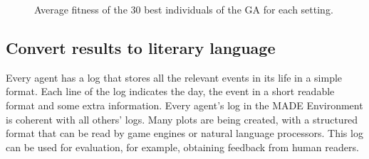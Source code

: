 \documentclass[letterpaper]{article}
\begin{document}
\begin{figure}[htb]
{   \label{fig:subfig2}
}
\caption{Average fitness of the 30 best individuals of the GA for each setting.}
\label{fig:graph}
\end{figure}







\subsection{Convert results to literary language}

Every agent has a log that stores all the relevant events in its life
in a simple format. Each line of the log indicates the day, the event
in a short readable format and some extra information. Every agent's
log in the MADE Environment is coherent with all others' logs. Many
plots are being created, with a structured format that can be read by
game engines or natural language processors. This log can be used for evaluation, for example, obtaining feedback from human readers.
\end{document}
